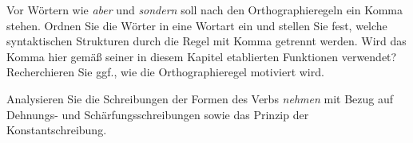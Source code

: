 \Uebung[\tristar] \label{u154} Vor Wörtern wie \textit{aber} und \textit{sondern} soll nach den Orthographieregeln ein Komma stehen.
Ordnen Sie die Wörter in eine Wortart ein und stellen Sie fest, welche syntaktischen Strukturen durch die Regel mit Komma getrennt werden.
Wird das Komma hier gemäß seiner in diesem Kapitel etablierten Funktionen verwendet?
Recherchieren Sie ggf., wie die Orthographieregel motiviert wird.

\Uebung[\tristar] \label{u155} Analysieren Sie die Schreibungen der Formen des Verbs \textit{nehmen} mit Bezug auf Dehnungs- und Schärfungsschreibungen sowie das Prinzip der Konstantschreibung.

